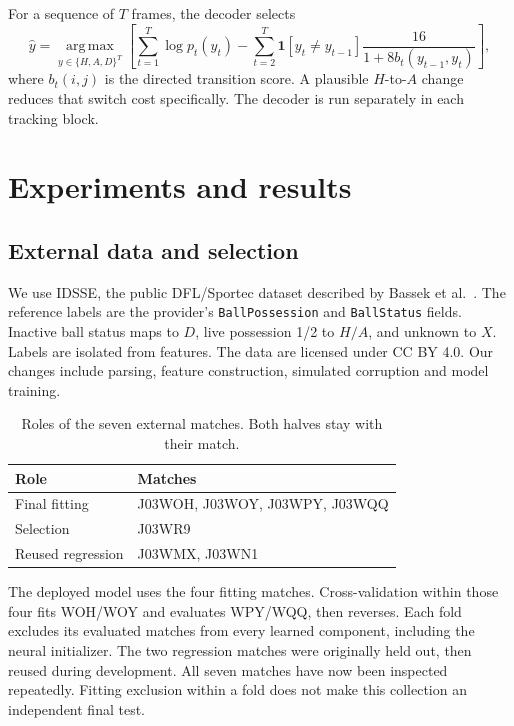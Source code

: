 \documentclass[11pt,a4paper]{article}
\begin{document}
\begin{samepage}
For a sequence of $T$ frames, the decoder selects
\begin{equation}
\hat y=\operatorname*{arg\,max}_{y\in\{H,A,D\}^T}
\left[\sum_{t=1}^{T}\log p_t(y_t)-
\sum_{t=2}^{T}\mathbf{1}[y_t\ne y_{t-1}]
\frac{16}{1+8b_t(y_{t-1},y_t)}\right],
\end{equation}
where $b_t(i,j)$ is the directed transition score. A plausible $H$-to-$A$ change
reduces that switch cost specifically. The decoder is run separately in each
tracking block.
\end{samepage}

\section{Experiments and results}
\subsection{External data and selection}
We use IDSSE, the public DFL/Sportec dataset described by Bassek et
al.~\cite{bassek,idsse}. The reference labels are the provider's
\texttt{BallPossession} and \texttt{BallStatus} fields. Inactive ball status maps
to $D$, live possession 1/2 to $H/A$, and unknown to $X$. Labels are isolated from
features. The data are licensed under CC BY 4.0. Our changes include parsing,
feature construction, simulated corruption and model training.

\begin{table}[ht]
\centering\small
\begin{tabularx}{\linewidth}{@{}lX@{}}
\toprule
Role & Matches \\
\midrule
Final fitting & J03WOH, J03WOY, J03WPY, J03WQQ \\
Selection & J03WR9 \\
Reused regression & J03WMX, J03WN1 \\
\bottomrule
\end{tabularx}
\caption{Roles of the seven external matches. Both halves stay with their match.}
\label{tab:split}
\end{table}

The deployed model uses the four fitting matches. Cross-validation within those
four fits WOH/WOY and evaluates WPY/WQQ, then reverses. Each fold excludes its
evaluated matches from every learned component, including the neural initializer.
The two regression matches were originally held out, then reused during
development. All seven matches have now been inspected repeatedly. Fitting
exclusion within a fold does not make this collection an independent final test.
\end{document}
